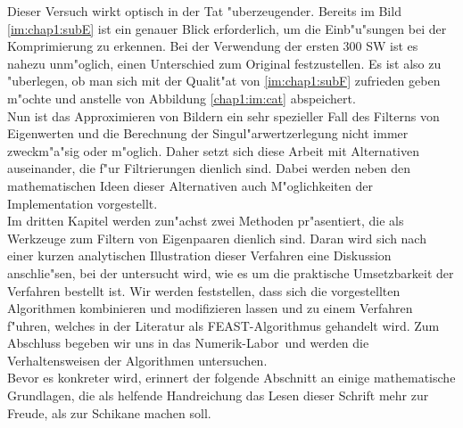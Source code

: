 Dieser Versuch wirkt optisch in der Tat "uberzeugender. Bereits im Bild \ref{im:chap1:subE} ist ein genauer Blick erforderlich, um die Einb"u"sungen bei der Komprimierung zu erkennen.
Bei der Verwendung der ersten 300 SW ist es nahezu unm"oglich, einen Unterschied zum Original festzustellen.
Es ist also zu "uberlegen, ob man sich mit der Qualit"at von \ref{im:chap1:subF} zufrieden geben m"ochte und anstelle von Abbildung \ref{chap1:im:cat} abspeichert.\\

Nun ist das Approximieren von Bildern ein sehr spezieller Fall des Filterns von Eigenwerten und die Berechnung der Singul"arwertzerlegung nicht immer zweckm"a"sig oder m"oglich.
Daher setzt sich diese Arbeit mit Alternativen auseinander, die f"ur Filtrierungen dienlich sind. Dabei werden neben den mathematischen Ideen dieser Alternativen auch M"oglichkeiten der Implementation vorgestellt.\\

Im dritten Kapitel werden zun"achst zwei Methoden pr"asentiert, die als Werkzeuge zum Filtern von Eigenpaaren dienlich sind.
Daran wird sich nach einer kurzen analytischen Illustration dieser Verfahren eine Diskussion anschlie"sen, bei der untersucht wird, wie es um die praktische Umsetzbarkeit der Verfahren bestellt ist.
Wir werden feststellen, dass sich die vorgestellten Algorithmen kombinieren und modifizieren lassen und zu einem Verfahren f"uhren, welches in der Literatur als FEAST-Algorithmus gehandelt wird. Zum Abschluss begeben wir uns in das \glqq Numerik-Labor\grqq\ und werden die Verhaltensweisen der Algorithmen untersuchen.\\

Bevor es konkreter wird, erinnert der folgende Abschnitt an einige mathematische Grundlagen, die als helfende Handreichung das Lesen dieser Schrift mehr zur Freude, als zur Schikane machen soll.
